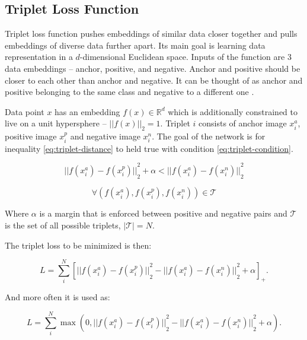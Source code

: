 \subsection{\label{sec:triplet-loss}Triplet Loss Function}

Triplet loss function pushes embeddings of similar data closer together and pulls embeddings of diverse data further apart. Its main goal is learning data representation in a $d$-dimensional Euclidean space. Inputs of the function are 3 data embeddings -- anchor, positive, and negative. Anchor and positive should be closer to each other than anchor and negative. It can be thought of as anchor and positive belonging to the same class and negative to a different one \cite{facenet-triplet-loss}.

Data point $x$ has an embedding $f(x) \in \mathbb{R}^d$ which is additionally constrained to live on a unit hypersphere -- ${|| f(x) ||}_2 = 1$. Triplet $i$ consists of anchor image $x^{a}_{i}$, positive image $x^{p}_{i}$ and negative image $x^{n}_{i}$. The goal of the network is for inequality  \ref{eq:triplet-distance} to held true with condition \ref{eq:triplet-condition}.

\begin{equation}
    \label{eq:triplet-distance}
    {|| f(x^{a}_{i}) - f(x^{p}_{i}) ||}^{2}_{2} + \alpha < {|| f(x^{a}_{i}) - f(x^{n}_{i}) ||}^{2}_{2}
\end{equation}

\begin{equation}
    \label{eq:triplet-condition}
    \forall ( f(x^{a}_{i}), f(x^{p}_{i}), f(x^{n}_{i})) \in \mathcal{T}
\end{equation}

\noindent Where $\alpha$ is a margin that is enforced between positive and negative pairs and $\mathcal{T}$ is the set of all possible triplets, $|\mathcal{T}| = N$.

The triplet loss to be minimized is then:

\begin{equation}
    \label{eq:triplet-loss1}
    L = \sum\limits^{N}_{i}
    \left[
    {|| f(x^{a}_{i}) - f(x^{p}_{i}) ||}^{2}_{2} - {|| f(x^{a}_{i}) - f(x^{n}_{i}) ||}^{2}_{2} + \alpha
    \right]_{+}.
\end{equation}

\noindent And more often it is used as:

\begin{equation}
    \label{eq:triplet-loss2}
    L = \sum\limits^{N}_{i}
    \max{(0, {|| f(x^{a}_{i}) - f(x^{p}_{i}) ||}^{2}_{2} - {|| f(x^{a}_{i}) - f(x^{n}_{i}) ||}^{2}_{2} + \alpha)}.
\end{equation}

